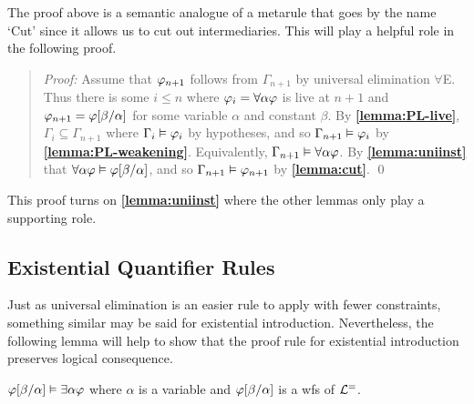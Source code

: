 The proof above is a semantic analogue of a metarule that goes by the name `Cut' since it allows us to cut out intermediaries.
This will play a helpful role in the following proof.




\begin{quote} 
  \textit{Proof:} Assume that $\varphi_{n+1}$ follows from $\Gamma_{n+1}$ by universal elimination $\forall$E.
  Thus there is some $i\leq n$ where $\varphi_i=\forall \alpha\varphi$ is live at $n+1$ and $\varphi_{n+1}=\varphi[\beta/\alpha]$ for some variable $\alpha$ and constant $\beta$.
  By \textbf{\ref{lemma:PL-live}}, $\Gamma_i\subseteq \Gamma_{n+1}$ where $\Gamma_i\vDash\varphi_i$ by hypotheses, and so $\Gamma_{n+1} \vDash \varphi_i$ by \textbf{\ref{lemma:PL-weakening}}.
  Equivalently, $\Gamma_{n+1} \vDash \forall \alpha\varphi$.
  By \textbf{\ref{lemma:uniinst}} that $\forall \alpha\varphi\vDash \varphi[\beta/\alpha]$, and so $\Gamma_{n+1}\vDash\varphi_{n+1}$ by \textbf{\ref{lemma:cut}}.
  \qed
\end{quote}

This proof turns on \textbf{\ref{lemma:uniinst}} where the other lemmas only play a supporting role.





\subsection{Existential Quantifier Rules}%
  \label{sub:ExistentialRules}
 
Just as universal elimination is an easier rule to apply with fewer constraints, something similar may be said for existential introduction.
Nevertheless, the following lemma will help to show that the proof rule for existential introduction preserves logical consequence.

\begin{Lthm} \label{lemma:exigen}
  $\varphi[\beta/\alpha] \vDash \exists\alpha\varphi$ where $\alpha$ is a variable and $\varphi[\beta/\alpha]$ is a wfs of $\mathcal{L}^{=}$. 
\end{Lthm}

